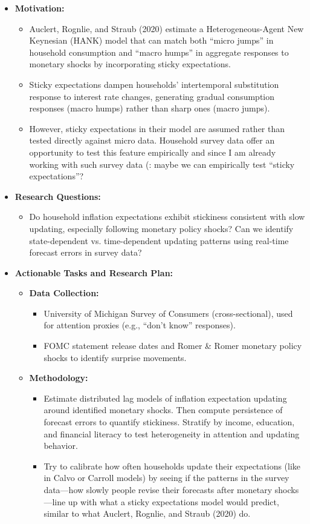 \documentclass[10pt]{article}
\begin{document}
\begin{itemize}
\item \textbf{Motivation:}
\begin{itemize}
    \item Auclert, Rognlie, and Straub (2020) estimate a Heterogeneous-Agent New Keynesian (HANK) model that can match both ``micro jumps'' in household consumption and ``macro humps'' in aggregate responses to monetary shocks by incorporating sticky expectations.
    \item Sticky expectations dampen households’ intertemporal substitution response to interest rate changes, generating gradual consumption responses (macro humps) rather than sharp ones (macro jumps).
    \item However, sticky expectations in their model are assumed rather than tested directly against micro data. Household survey data offer an opportunity to test this feature empirically and since I am already working with such survey data (: maybe we can empirically test ``sticky expectations''?
\end{itemize}

\item \textbf{Research Questions:}
\begin{itemize}
    \item Do household inflation expectations exhibit stickiness consistent with slow updating, especially following monetary policy shocks? Can we identify state-dependent vs. time-dependent updating patterns using real-time forecast errors in survey data?
\end{itemize}

\item \textbf{Actionable Tasks and Research Plan:}
\begin{itemize}
    \item \textbf{Data Collection:}
    \begin{itemize}
        \item University of Michigan Survey of Consumers (cross-sectional), used for attention proxies (e.g., “don’t know” responses).
        \item FOMC statement release dates and Romer \& Romer monetary policy shocks to identify surprise movements.
    \end{itemize}
    \item \textbf{Methodology:}
    \begin{itemize}
        \item Estimate distributed lag models of inflation expectation updating around identified monetary shocks. Then compute persistence of forecast errors to quantify stickiness. Stratify by income, education, and financial literacy to test heterogeneity in attention and updating behavior.
         \item Try to calibrate how often households update their expectations (like in Calvo or Carroll models) by seeing if the patterns in the survey data—how slowly people revise their forecasts after monetary shocks—line up with what a sticky expectations model would predict, similar to what Auclert, Rognlie, and Straub (2020) do.
    \end{itemize}
\end{itemize}


\end{itemize}
\end{document}
